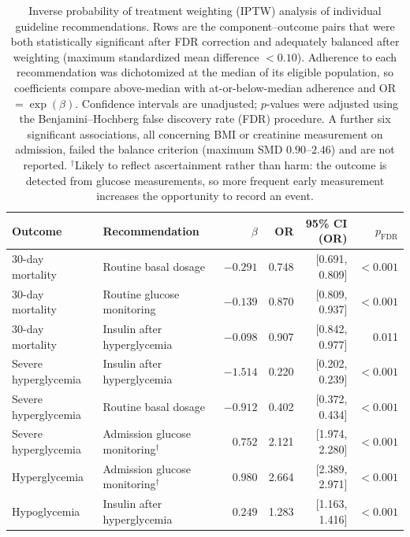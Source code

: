 \begin{table}[t]
\centering
\caption{Inverse probability of treatment weighting (IPTW) analysis of
individual guideline recommendations. Rows are the component--outcome pairs
that were both statistically significant after FDR correction and adequately
balanced after weighting (maximum standardized mean difference
$<0.10$). Adherence to each recommendation was dichotomized at the median of
its eligible population, so coefficients compare above-median with
at-or-below-median adherence and OR $=\exp(\beta)$. Confidence intervals are
unadjusted; $p$-values were adjusted using the Benjamini--Hochberg false
discovery rate (FDR) procedure. A further six significant associations, all
concerning BMI or creatinine measurement on admission, failed the balance
criterion (maximum SMD $0.90$--$2.46$) and are not reported.
$^{\dagger}$Likely to reflect ascertainment rather than harm: the outcome is
detected from glucose measurements, so more frequent early measurement
increases the opportunity to record an event.}
\label{tab:iptw-patterns}

\small
\setlength{\tabcolsep}{4pt}

\begin{tabular}{llrrrr}
\toprule
Outcome & Recommendation & $\beta$ & OR & 95\% CI (OR) & $p_{\mathrm{FDR}}$ \\
\midrule

30-day mortality & Routine basal dosage
    & $-0.291$ & 0.748 & [0.691, 0.809] & $<0.001$ \\

30-day mortality & Routine glucose monitoring
    & $-0.139$ & 0.870 & [0.809, 0.937] & $<0.001$ \\

30-day mortality & Insulin after hyperglycemia
    & $-0.098$ & 0.907 & [0.842, 0.977] & 0.011 \\

\midrule

Severe hyperglycemia & Insulin after hyperglycemia
    & $-1.514$ & 0.220 & [0.202, 0.239] & $<0.001$ \\

Severe hyperglycemia & Routine basal dosage
    & $-0.912$ & 0.402 & [0.372, 0.434] & $<0.001$ \\

Severe hyperglycemia & Admission glucose monitoring$^{\dagger}$
    & $0.752$ & 2.121 & [1.974, 2.280] & $<0.001$ \\

\midrule

Hyperglycemia & Admission glucose monitoring$^{\dagger}$
    & $0.980$ & 2.664 & [2.389, 2.971] & $<0.001$ \\

\midrule

Hypoglycemia & Insulin after hyperglycemia
    & $0.249$ & 1.283 & [1.163, 1.416] & $<0.001$ \\

\bottomrule
\end{tabular}
\end{table}
